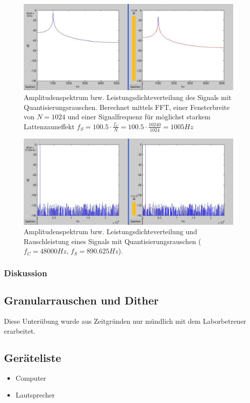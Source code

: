 \begin{figure}[h!]
\centering
\includegraphics[width=\columnwidth]{figures/Aufg1/2_2_fenster_schlecht.JPG} 
\caption{Amplitudenspektrum bzw. Leistungsdichteverteilung des Signals mit Quantisierungsrauschen. Berechnet mittels FFT, einer Fensterbreite von $N = 1024$ und einer Signalfrequenz für möglichst starkem Lattenzauneffekt $f_S = 100.5 \cdot \frac{f_C}{N} = 100.5 \cdot \frac{10240}{1024} = 1005Hz$}
\end{figure}

\begin{figure}[h!]
\centering
\includegraphics[width=\columnwidth]{figures/Aufg1/2_3_890hz.JPG} 
\caption{Amplitudenspektrum bzw. Leistungsdichteverteilung und Rauschleistung eines Signals mit Quantisierungsrauschen ($f_C = 48000Hz$, $f_S = 890.625Hz$).}
\end{figure}

\clearpage

\subsubsection{Diskussion}

%
%

\subsection{Granularrauschen und Dither}
Diese Unterübung wurde aus Zeitgründen nur mündlich mit dem Laborbetreuer erarbeitet. 

\subsection{Geräteliste}
\begin{itemize}
\item Computer
\item Lautsprecher
\end{itemize}
